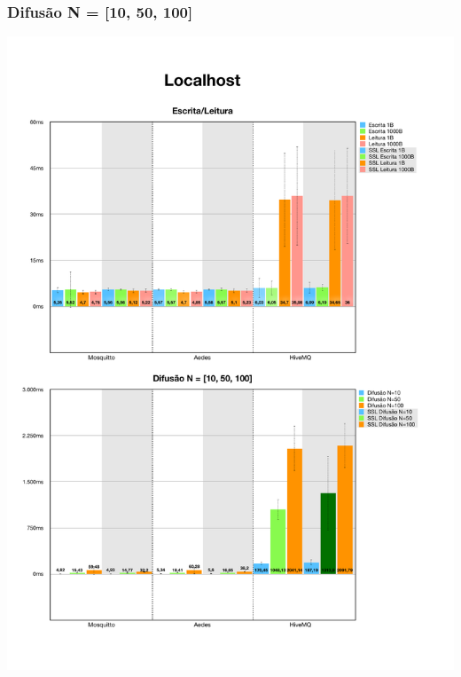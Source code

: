 \documentclass[12pt,a4paper]{article}
\begin{document}
\subsubsection{Difusão N = [10, 50, 100]}
\begin{center}
\includegraphics[width=1.0\textwidth]{local_spread1.pdf}
\end{center}
\end{document}
